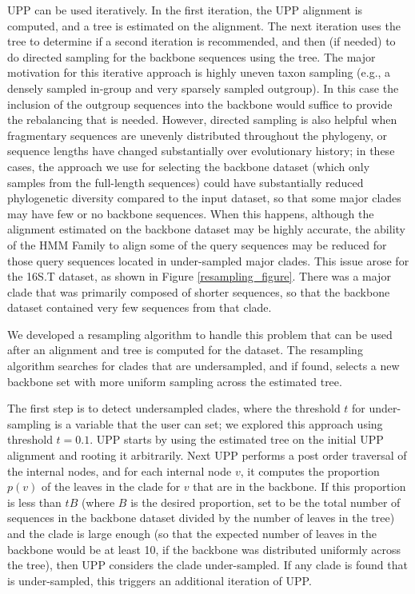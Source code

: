 UPP can be used iteratively. In the
first iteration, the UPP alignment is computed,
and a tree is estimated on the alignment.
The next iteration uses the tree to determine
if a second iteration is recommended, and then 
(if needed) 
to do directed sampling for the backbone sequences using
the tree. 
The major motivation for this iterative approach is
highly uneven taxon sampling (e.g., a densely sampled
in-group and very sparsely sampled outgroup). In this
case the inclusion of the outgroup sequences into the
backbone would suffice to provide the rebalancing that is
needed.
However, directed sampling is also helpful when
fragmentary sequences are unevenly distributed throughout the
phylogeny, or sequence lengths have changed substantially
over evolutionary history; in these cases, 
 the approach we use for selecting
the backbone dataset (which only samples from
the full-length sequences) could 
have substantially reduced
phylogenetic diversity compared to the input dataset, so that some
major clades may have few or no backbone sequences.
When this happens, although the alignment estimated 
on the backbone dataset may be highly accurate, the ability of
the HMM Family to align some of the query
sequences may be reduced for those query sequences 
located in under-sampled major clades.
This issue arose for the 16S.T dataset, 
as shown in Figure \ref{resampling_figure}.
There was a major clade that was primarily composed of shorter
sequences, so that the backbone dataset contained very few
sequences from that clade.  


We developed a 
resampling algorithm to handle this problem that can be used
after an alignment and tree is computed for the dataset.
The resampling algorithm searches for clades that are undersampled, 
and if found, selects a new backbone set 
with more uniform sampling across the estimated tree.

The first step is to detect undersampled clades, where
the threshold $t$ for under-sampling is a variable that the
user can set; we explored this approach using threshold $t=0.1$.
UPP starts by using the estimated tree on 
the initial UPP alignment and rooting it arbitrarily.  
Next UPP performs a post order traversal of the internal nodes, 
and for each internal node $v$, 
it computes the proportion $p(v)$ of the leaves in the clade for $v$
that are in the backbone. If this proportion is less than $tB$
(where $B$ is the desired proportion, set to be the total number
of sequences in the backbone dataset divided by the number of
leaves in the tree)
and the clade is large enough
(so that the expected number of leaves in the backbone would be at
least 10, if the backbone was distributed uniformly across the tree), 
then UPP considers the clade under-sampled. If any clade is found
that is under-sampled, this triggers an additional iteration of UPP.

